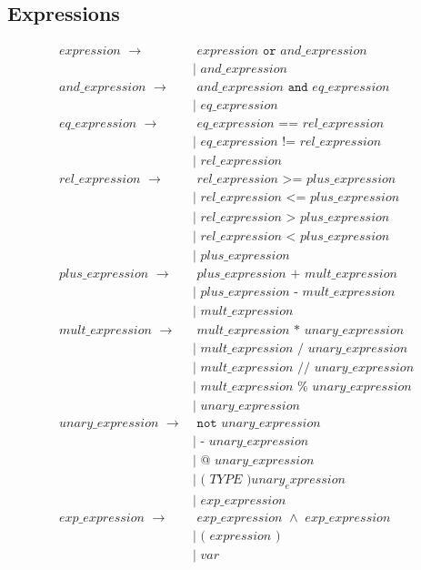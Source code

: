 \documentclass{article}
\newcommand{\code}{\texttt}
\begin{document}
\subsection{Expressions}
\begin{align*}
expression\,\,\rightarrow&\,\,expression\,\,\code{or}\,\,and\_expression\\
                    & |\,\,and\_expression\\
and\_expression\,\,\rightarrow&\,\,and\_expression\,\,\code{and}\,\,eq\_expression\\
                    & |\,\,eq\_expression\\
eq\_expression\,\,\rightarrow&\,\,eq\_expression\,\,\code{==}\,\,rel\_expression\\
                    & |\,\,eq\_expression\,\,\code{!=}\,\,rel\_expression\\
                    & |\,\,rel\_expression\\
rel\_expression\,\,\rightarrow&\,\,rel\_expression\,\,\code{>=}\,\,plus\_expression\\
                    & |\,\,rel\_expression\,\,\code{<=}\,\,plus\_expression\\
                    & |\,\,rel\_expression\,\,\code{>}\,\,plus\_expression\\
                    & |\,\,rel\_expression\,\,\code{<}\,\,plus\_expression\\
                    & |\,\,plus\_expression\\
plus\_expression\,\,\rightarrow&\,\,plus\_expression\,\,\code{+}\,\,mult\_expression\\
                    & |\,\,plus\_expression\,\,\code{-}\,\,mult\_expression\\
                    & |\,\,mult\_expression\\
mult\_expression\,\,\rightarrow&\,\,mult\_expression\,\,\code{*}\,\,unary\_expression\\
                    & |\,\,mult\_expression\,\,\code{/}\,\,unary\_expression\\
                    & |\,\,mult\_expression\,\,\code{//}\,\,unary\_expression\\
                    & |\,\,mult\_expression\,\,\code{\%}\,\,unary\_expression\\
                    & |\,\,unary\_expression\\
unary\_expression\,\,\rightarrow&\,\,\code{not}\,\,unary\_expression\\
                    & |\,\,\code{-}\,\,unary\_expression\\
                    & |\,\,\code{@}\,\,unary\_expression\\
                    & |\,\,\code{(}\,\,TYPE\,\,\code{)} unary_expression\\
                    & |\,\,exp\_expression\\
exp\_expression\,\, \rightarrow&\,\,exp\_expression\,\,\code{$\wedge$}\,\, exp\_expression\\
                    & |\,\,\code{(}\,\,expression\,\,\code{)}\\
                    & |\,\,var
\end{align*}
\end{document}
